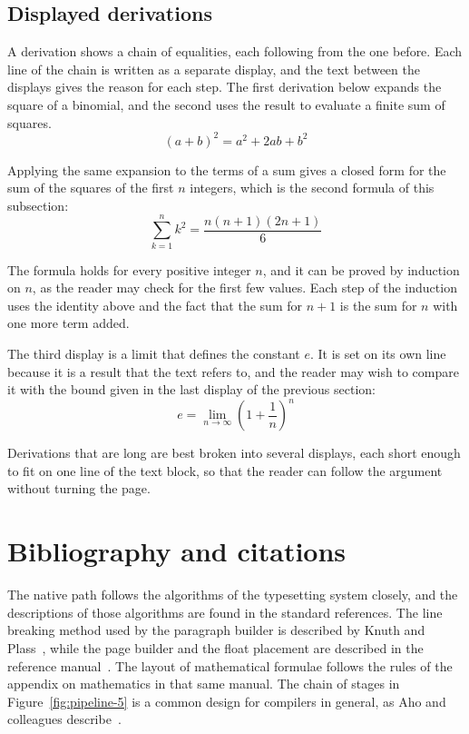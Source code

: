 \documentclass{article}
\begin{document}
\subsection{Displayed derivations}\label{sec:derivations-5}

A derivation shows a chain of equalities, each following from the one before. Each line
of the chain is written as a separate display, and the text between the displays gives
the reason for each step. The first derivation below expands the square of a binomial,
and the second uses the result to evaluate a finite sum of squares.
\[
  (a+b)^{2} = a^{2} + 2ab + b^{2}
\]

Applying the same expansion to the terms of a sum gives a closed form for the sum of the
squares of the first $n$ integers, which is the second formula of this subsection:
\[
  \sum_{k=1}^{n} k^{2} = \frac{n(n+1)(2n+1)}{6}
\]

The formula holds for every positive integer $n$, and it can be proved by induction on
$n$, as the reader may check for the first few values. Each step of the induction
uses the identity above and the fact that the sum for $n+1$ is the sum for $n$ with one
more term added.

The third display is a limit that defines the constant $e$. It is set on its own line
because it is a result that the text refers to, and the reader may wish to compare it
with the bound given in the last display of the previous section:
\[
  e = \lim_{n\to\infty} \left( 1 + \frac{1}{n} \right)^{n}
\]

Derivations that are long are best broken into several displays, each short enough to
fit on one line of the text block, so that the reader can follow the argument without
turning the page.

\section{Bibliography and citations}\label{sec:refs-5}

The native path follows the algorithms of the typesetting system closely, and the
descriptions of those algorithms are found in the standard references. The line
breaking method used by the paragraph builder is described by Knuth and
Plass~\cite{knuth81-5}, while the page builder and the float placement are described in
the reference manual~\cite{knuth86-5}. The layout of mathematical formulae follows the
rules of the appendix on mathematics in that same manual. The chain of stages in
Figure~\ref{fig:pipeline-5} is a common design for compilers in general, as Aho and
colleagues describe~\cite{aho06-5}.
\end{document}
